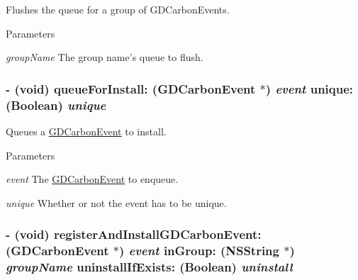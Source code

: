 Flushes the queue for a group of GDCarbonEvents. 
\begin{DoxyParams}{Parameters}
\item[{\em groupName}]The group name's queue to flush. \end{DoxyParams}
\hypertarget{interface_g_d_carbon_event_manager_a1eddf82bb8d798147c3fcde4aa81ed34}{
\subsubsection[{queueForInstall:unique:}]{\setlength{\rightskip}{0pt plus 5cm}-\/ (void) queueForInstall: ({\bf GDCarbonEvent} $\ast$) {\em event}\/ unique: (Boolean) {\em unique}}}
\label{interface_g_d_carbon_event_manager_a1eddf82bb8d798147c3fcde4aa81ed34}


Queues a \hyperlink{interface_g_d_carbon_event}{GDCarbonEvent} to install. 
\begin{DoxyParams}{Parameters}
\item[{\em event}]The \hyperlink{interface_g_d_carbon_event}{GDCarbonEvent} to enqueue. \item[{\em unique}]Whether or not the event has to be unique. \end{DoxyParams}
\hypertarget{interface_g_d_carbon_event_manager_a5bb7116bfbb92eb5bf5651192c855611}{
\subsubsection[{registerAndInstallGDCarbonEvent:inGroup:uninstallIfExists:}]{\setlength{\rightskip}{0pt plus 5cm}-\/ (void) registerAndInstallGDCarbonEvent: ({\bf GDCarbonEvent} $\ast$) {\em event}\/ inGroup: ({\bf NSString} $\ast$) {\em groupName}\/ uninstallIfExists: (Boolean) {\em uninstall}}}
\label{interface_g_d_carbon_event_manager_a5bb7116bfbb92eb5bf5651192c855611}


